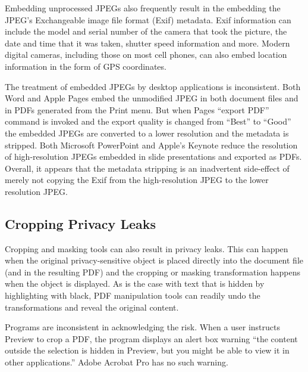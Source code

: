 Embedding unprocessed JPEGs also frequently result in the
embedding the JPEG's Exchangeable image file format (Exif) metadata. Exif
information can include the model and serial number of the camera that
took the picture, the date and time that it was taken, shutter speed
information and more. Modern digital cameras, including those on most
cell phones, can also embed location information in the form of GPS
coordinates.

The treatment of embedded JPEGs by desktop applications is
inconsistent. Both Word and Apple Pages embed the
unmodified JPEG in both document files and in PDFs generated from the Print
menu. But when Pages ``export PDF'' command is invoked and the export
quality is changed from ``Best'' to ``Good'' the embedded
JPEGs are converted to a lower resolution and the metadata is stripped.
Both Microsoft PowerPoint and Apple's Keynote reduce the resolution of
high-resolution JPEGs embedded in slide presentations and exported as
PDFs. Overall,  it appears that the metadata stripping is an
inadvertent side-effect of
merely not copying the Exif from the high-resolution JPEG to the lower
resolution JPEG.


\subsection{Cropping Privacy Leaks}

Cropping and masking tools can also result in
privacy leaks. This can happen when the original privacy-sensitive
object is placed directly into the document file (and in the resulting
PDF) and the cropping or masking transformation happens when the
object is displayed. As is the case with text that is hidden by
highlighting with black, PDF manipulation tools can readily undo the
transformations and reveal the original content.

Programs are inconsistent in acknowledging the risk. When a user instructs Preview to crop a PDF, the program
displays an alert box warning ``the content outside the selection is
hidden in Preview, but you might be able to view it in other
applications.'' Adobe Acrobat Pro has no such warning.



